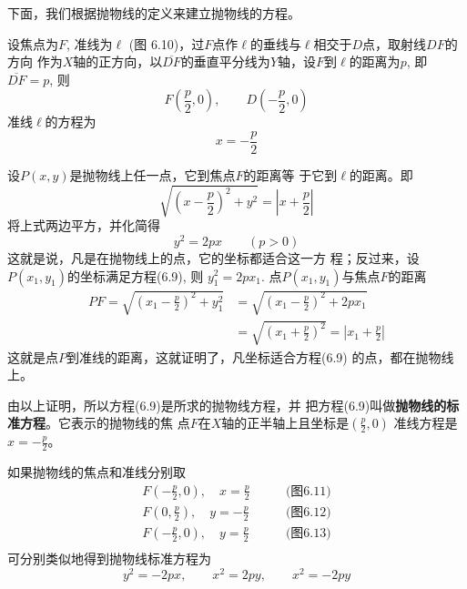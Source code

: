 下面，我们根据抛物线的定义来建立抛物线的方程。

\begin{figure}[htp]
    \centering
{}
    \caption{}
\end{figure}

设焦点为$F$, 准线为$\ell$ (图
6.10)，过$F$点作$\ell$的垂线与$\ell$相交于$D$点，取射线$DF$的方向
作为$X$轴的正方向，以$\overline{DF}$的垂直平分线为$Y$轴，设$F$到$\ell$的距离为$p$, 即$\overline{DF}=p$, 则
\[F\left(\frac{p}{2},0\right),\qquad D\left(-\frac{p}{2},0\right)\]
准线$\ell$的方程为
\[x=-\frac{p}{2}\]

设$P(x,y)$是抛物线上任一点，它到焦点$F$的距离等
于它到$\ell$的距离。即
\[\sqrt{\left(x-\frac{p}{2}\right)^2+y^2}=\left|x+\frac{p}{2}\right|\]
将上式两边平方，并化简得
\begin{equation}
    y^2=2px\qquad (p>0)
\end{equation}
这就是说，凡是在抛物线上的点，它的坐标都适合这一方
程；反过来，设$P(x_1,y_1)$的坐标满足方程(6.9), 则
$y_1^2=2px_1$. 点$P(x_1,y_1)$与焦点$F$的距离
\[\begin{split}
    PF=\sqrt{\left(x_1-\frac{p}{2}\right)^2+y^2_1}&=\sqrt{\left(x_1-\frac{p}{2}\right)^2+2px_1}\\
    &=\sqrt{\left(x_1+\frac{p}{2}\right)^2}=\left|x_1+\frac{p}{2}\right|
\end{split}\]
这就是点$P$到准线的距离，这就证明了，凡坐标适合方程(6.9)
的点，都在抛物线上。

由以上证明，所以方程(6.9)是所求的抛物线方程，并
把方程(6.9)叫做\textbf{抛物线的标准方程}。它表示的抛物线的焦
点$F$在$X$轴的正半轴上且坐标是$\left(\frac{p}{2},0\right)$
准线方程是$x=-\frac{p}{2}$。

如果抛物线的焦点和准线分别取
\[\begin{split}
F\left(-\frac{p}{2},0\right),\quad x=\frac{p}{2}&\qquad \text{(图6.11)}\\
F\left(0,\frac{p}{2}\right),\quad y=-\frac{p}{2}&\qquad \text{(图6.12)}\\
F\left(-\frac{p}{2},0\right),\quad y=\frac{p}{2}&\qquad \text{(图6.13)}\\
\end{split}\]
可分别类似地得到抛物线标准方程为
\[y^2=-2px,\qquad x^2=2py,\qquad x^2=-2py\]

